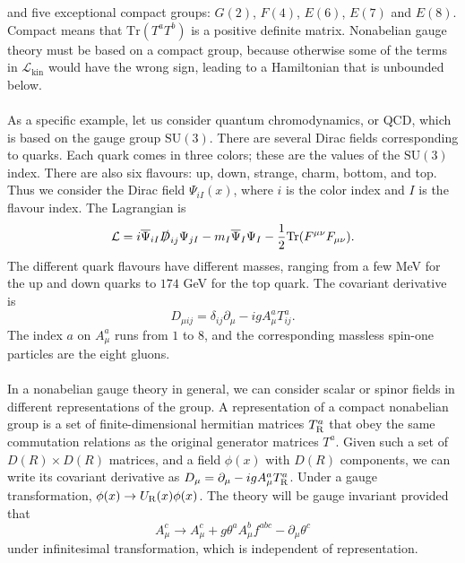 and five exceptional compact groups: $G(2)$, $F(4)$, $E(6)$, $E(7)$ and $E(8)$. Compact means that $\mathrm{Tr}(T^aT^b)$ is a positive definite matrix. Nonabelian gauge theory must be based on a compact group, because otherwise some of the
terms in $\mathcal{L}_{\mathrm{kin}}$ would have the wrong sign, leading to a Hamiltonian that is unbounded below.
\\ \\
As a specific example, let us consider quantum chromodynamics, or QCD, which is based on the gauge group $\mathrm{SU}(3)$. There are several Dirac fields corresponding to quarks. Each quark comes in three colors; these are the
values of the $\mathrm{SU}(3)$ index. 
There are also six flavours: up, down, strange, charm, bottom, and top. Thus we consider the Dirac field $\Psi_{iI}(x)$, where $i$ is the color index and $I$ is the flavour index. The Lagrangian is
\[\mathcal{L} = i\overline{\Psi}_{iI}\slashed{D}_{ij}\Psi_{jI} - m_I\overline{\Psi}_{I}\Psi_{I} - \frac{1}{2}\mathrm{Tr}(F^{\mu\nu}F_{\mu\nu}).\]
The different quark flavours have different masses, ranging from a few MeV for the up and down quarks to $174$ GeV for the top quark. The covariant derivative is
\[D_{\mu ij} = \delta_{ij}\partial_{\mu} - igA^a_{\mu}T^a_{ij}.\]
The index $a$ on $A^a_{\mu}$ runs from $1$ to $8$, and the corresponding massless spin-one particles are the eight gluons.
\\ \\
In a nonabelian gauge theory in general, we can consider scalar or spinor fields in different representations of the group. A representation of a compact nonabelian group is a set of finite-dimensional hermitian matrices $T^a_{\rm R}$ that obey the same commutation relations as the original generator matrices $T^a$. 
Given such a set of $D(R)\times D(R)$ matrices, and
a field $\phi(x)$ with $D(R)$ components, we can write its covariant derivative as $D_{\mu} = \partial_{\mu} -igA^a_{\mu}T^a_{\rm R}$. 
Under a gauge transformation, $\phi(x) \to U_{\rm R}(x)\phi(x)$. The theory will be gauge invariant provided that
\[A^c_{\mu} \to A^c_{\mu} + g\theta^aA^b_{\mu}f^{abc} - \partial_{\mu}\theta^c\]
under infinitesimal transformation, which is independent of representation.

